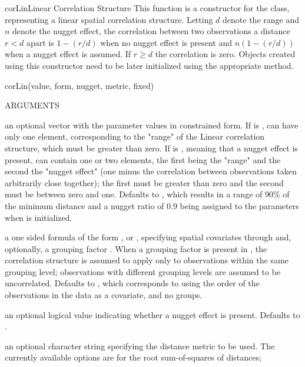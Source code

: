 \documentclass[pdftex]{article} \usepackage{url,graphicx}
\renewcommand{\Twiddle}{\mbox{\(\sim\)}}
\begin{document}
\begin{Helpfile}{corLin}{Linear Correlation Structure}
  This function is a constructor for the  class,
  representing a linear spatial correlation structure. Letting $d$
  denote the range and $n$ denote the nugget effect, the correlation
  between two observations a distance $r < d$ apart is $1-(r/d)$ when
  no nugget effect is present and $n(1-(r/d))$ when a nugget effect is
  assumed. If $r \geq d$ the correlation is zero. Objects created
  using this constructor need to be later initialized using the
  appropriate  method.
\begin{Example}
corLin(value, form, nugget, metric, fixed)
\end{Example}
\begin{Argument}{ARGUMENTS}
\item[\Co{value:}] an optional vector with the parameter values in
  constrained form. If  is ,  can have
  only one element, corresponding to the "range" of the Linear
  correlation structure, which must be greater than zero. If
   is , meaning that a nugget effect is present,
   can contain one or two elements, the first being the
  "range" and the second the "nugget effect" (one minus the
  correlation between observations taken arbitrarily close together);
  the first must be greater than zero and the second must be between
  zero and one. Defaults to , which results in a range
  of 90\% of the minimum distance and a nugget ratio of 0.9 being
  assigned to the parameters when  is initialized.
\item[\Co{form:}]
a one sided formula of the form \Co{{\Twiddle} S1+...+Sp}, or
\Co{{\Twiddle} S1+...+Sp | g}, specifying spatial covariates 
through  and,  optionally, a grouping factor . 
When a grouping factor is present in , the correlation
structure is assumed to apply only to observations within the same
grouping level; observations with different grouping levels are
assumed to be uncorrelated. Defaults to \Co{{\Twiddle} 1}, which corresponds
to using the order of the observations in the data as a covariate,
and no groups.
\item[\Co{nugget:}]
an optional logical value indicating whether a nugget
effect is present. Defaults to .
\item[\Co{metric:}]
an optional character string specifying the distance
metric to be used. The currently available options are
 for the root sum-of-squares of distances;

\end{Argument}
\end{Helpfile}
\end{document}
